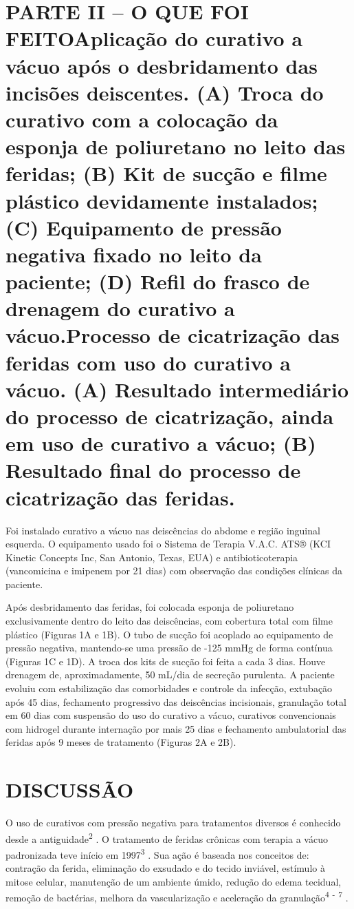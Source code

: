 \documentclass[numberinsection,times,10pt,spreadimages]{memoir}
\begin{document}
\section{PARTE II – O QUE FOI FEITOAplicação do curativo a vácuo após o
desbridamento das incisões
deiscentes. (A) Troca do curativo com a colocação da esponja de poliuretano
no leito das feridas; (B) Kit de sucção e filme plástico devidamente
instalados; (C) Equipamento de pressão negativa fixado no leito da paciente;
(D) Refil do frasco de drenagem do curativo a vácuo.Processo de cicatrização das
feridas com uso do curativo a vácuo. (A)
Resultado intermediário do processo de cicatrização, ainda em uso de
curativo a vácuo; (B) Resultado final do processo de cicatrização das
feridas.}

Foi instalado curativo a vácuo nas deiscências do abdome e região inguinal
esquerda.
O equipamento usado foi o Sistema de Terapia V.A.C. ATS® (KCI Kinetic Concepts
Inc,
San Antonio, Texas, EUA) e antibioticoterapia (vancomicina e imipenem por 21
dias)
com observação das condições clínicas da paciente.

Após desbridamento das feridas, foi colocada esponja de poliuretano
exclusivamente
dentro do leito das deiscências, com cobertura total com filme plástico (Figuras
1A e 1B). O tubo de sucção foi acoplado ao equipamento de pressão negativa,
mantendo-se uma pressão de -125 mmHg de forma contínua (Figuras 1C e 1D). A
troca dos kits de sucção foi feita a cada 3 dias. Houve drenagem de,
aproximadamente, 50 mL/dia de secreção purulenta. A paciente evoluiu com
estabilização das comorbidades e controle da infecção, extubação após 45 dias,
fechamento progressivo das deiscências incisionais, granulação total em 60 dias
com
suspensão do uso do curativo a vácuo, curativos convencionais com hidrogel
durante
internação por mais 25 dias e fechamento ambulatorial das feridas após 9 meses
de
tratamento (Figuras 2A e 2B).

\section{DISCUSSÃO}

O uso de curativos com pressão negativa para tratamentos diversos é conhecido
desde a
antiguidade\textsuperscript{2}
. O tratamento de
feridas crônicas com terapia a vácuo padronizada teve início em
1997\textsuperscript{3}
. Sua ação é baseada nos conceitos
de: contração da ferida, eliminação do exsudado e do tecido inviável, estímulo à
mitose celular, manutenção de um ambiente úmido, redução do edema tecidual,
remoção
de bactérias, melhora da vascularização e aceleração da
granulação\textsuperscript{4}
\textsuperscript{-}
\textsuperscript{7}
.
\end{document}
